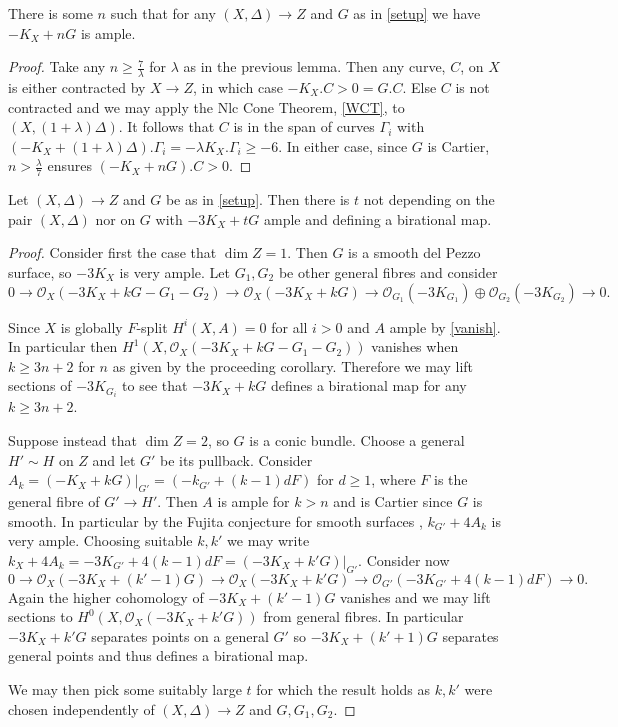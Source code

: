 \documentclass[a4paper,12pt]{book}
\newcommand{\ox}{\mathcal{O}_{X}}
\begin{document}
\begin{corollary}\label{nAmple}
	There is some $n$ such that for any $(X,\Delta) \to Z$ and $G$ as in \autoref{setup} we have $-K_{X}+nG$ is ample.
\end{corollary}


\begin{proof}
	Take any $n \geq \frac{7}{\lambda}$ for $\lambda$ as in the previous lemma. Then any curve, $C$, on $X$ is either contracted by $X \to Z$, in which case $-K_{X}.C>0=G.C$. Else $C$ is not contracted and we may apply the Nlc Cone Theorem, \autoref{WCT}, to $(X,(1+\lambda)\Delta)$. It follows that $C$ is in the span of curves $\Gamma_{i}$ with $(-K_{X}+(1+\lambda)\Delta).\Gamma_{i} = -\lambda K_{X}.\Gamma_{i} \geq -6$. In either case, since $G$ is Cartier, $n> \frac{\lambda}{7}$ ensures $(-K_{X}+nG).C >0$.
\end{proof}

\begin{theorem}
	Let $(X,\Delta) \to Z$ and $G$ be as in \autoref{setup}. Then there is $t$ not depending on the pair $(X,\Delta)$ nor on $G$ with $-3K_{X}+tG$ ample and defining a birational map. 
\end{theorem}
\begin{proof}
	Consider first the case that $\dim Z=1$. Then $G$ is a smooth del Pezzo surface, so $-3K_{X}$ is very ample. Let $G_{1},G_{2}$ be other general fibres and consider
	\[0 \to \ox(-3K_{X}+kG-G_{1}-G_{2}) \to \ox(-3K_{X}+kG) \to \mathcal{O}_{G_{1}}(-3K_{G_{1}})\oplus \mathcal{O}_{G_{2}}(-3K_{G_{2}}) \to 0.\]
	
	Since $X$ is globally $F$-split $H^{i}(X,A)=0$ for all $i>0$ and $A$ ample by \autoref{vanish}. In particular then $H^{1}(X,\ox(-3K_{X}+kG-G_{1}-G_{2}))$ vanishes when $k\geq 3n+2$ for $n$ as given by the proceeding corollary. Therefore we may lift sections of $-3K_{G_{i}}$ to see that $-3K_{X}+kG$ defines a birational map for any $k \geq 3n+2$. 
	
	Suppose instead that $\dim Z=2$, so $G$ is a conic bundle. Choose a general $H'\sim H$ on $Z$ and let $G'$ be its pullback. Consider $A_{k}=(-K_{X}+kG)|_{G'}=(-k_{G'}+(k-1)dF)$ for $d \geq 1$, where $F$ is the general fibre of $G'\to H'$. Then $A$ is ample for $k >n$ and is Cartier since $G$ is smooth. In particular by the Fujita conjecture for smooth surfaces \cite[Corollary 2.5]{terakawa1999d}, $k_{G'}+4A_{k}$ is very ample. Choosing suitable $k,k'$ we may write $k_{X}+4A_{k}=-3K_{G'}+4(k-1)dF=(-3K_{X}+k'G)|_{G'}$. Consider now
	\[0 \to \ox(-3K_{X}+(k'-1)G)\to \ox(-3K_{X}+k'G)\to \mathcal{O}_{G'}(-3K_{G'}+4(k-1)dF) \to 0.\]
	Again the higher cohomology of $-3K_{X}+(k'-1)G$ vanishes and we may lift sections to $H^{0}(X,\ox(-3K_{X}+k'G))$ from general fibres. In particular $-3K_{X}+k'G$ separates points on a general $G'$ so $-3K_{X}+(k'+1)G$ separates general points and thus defines a birational map. 
	
	We may then pick some suitably large $t$ for which the result holds as $k,k'$ were chosen independently of $(X,\Delta) \to Z$ and $G,G_{1},G_{2}$.
\end{proof}
\end{document}
